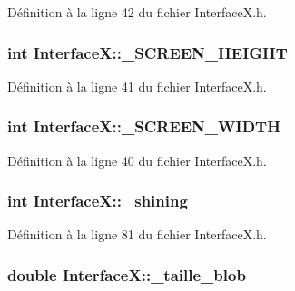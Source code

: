 Définition à la ligne 42 du fichier InterfaceX.h.

\hypertarget{a00011_a9da581df6276df3710ac37ae617360bb}{
\subsubsection[{\_\-SCREEN\_\-HEIGHT}]{\setlength{\rightskip}{0pt plus 5cm}int {\bf InterfaceX::\_\-SCREEN\_\-HEIGHT}}}
\label{a00011_a9da581df6276df3710ac37ae617360bb}


Définition à la ligne 41 du fichier InterfaceX.h.

\hypertarget{a00011_a6f00bbd8d46ea6a53c148bc74a78db05}{
\subsubsection[{\_\-SCREEN\_\-WIDTH}]{\setlength{\rightskip}{0pt plus 5cm}int {\bf InterfaceX::\_\-SCREEN\_\-WIDTH}}}
\label{a00011_a6f00bbd8d46ea6a53c148bc74a78db05}


Définition à la ligne 40 du fichier InterfaceX.h.

\hypertarget{a00011_a1ee3f9d7baf7a8bdc58d2fe0c215ac83}{
\subsubsection[{\_\-shining}]{\setlength{\rightskip}{0pt plus 5cm}int {\bf InterfaceX::\_\-shining}}}
\label{a00011_a1ee3f9d7baf7a8bdc58d2fe0c215ac83}


Définition à la ligne 81 du fichier InterfaceX.h.

\hypertarget{a00011_accea7493bc80f704415600c1e3925df2}{
\subsubsection[{\_\-taille\_\-blob}]{\setlength{\rightskip}{0pt plus 5cm}double {\bf InterfaceX::\_\-taille\_\-blob}}}
\label{a00011_accea7493bc80f704415600c1e3925df2}


